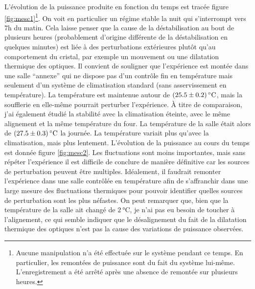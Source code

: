 \documentclass[11pt,a4paper]{article}
\begin{document}
L'évolution de la puissance produite en fonction du temps est tracée figure \ref{fig:mesc1}\footnote{Aucune manipulation n'a été effectuée sur le système pendant ce temps. En particulier, les remontées de puissance sont du fait du système lui-même. L'enregistrement a été arrêté après une absence de remontée sur plusieurs heures.}. On voit en particulier un régime stable la nuit qui s'interrompt vers 7h du matin. Cela laisse penser que la cause de la déstabilisation au bout de plusieurs heures (probablement d'origine différente de la déstabilisation en quelques minutes) est liée à des perturbations extérieures plutôt qu'au comportement du cristal, par exemple un mouvement ou une dilatation thermique des optiques. Il convient de souligner que l'expérience est montée dans une salle ``annexe'' qui ne dispose pas d'un contrôle fin en température mais seulement d'un système de climatisation standard (sans asservissement en température). La température est maintenue autour de $\SI{25.5+-0.2}{\celsius}$, mais la soufflerie en elle-même pourrait perturber l'expérience. À titre de comparaison, j'ai également étudié la stabilité avec la climatisation éteinte, avec le même alignement et la même température du four. La température de la salle était alors de $\SI{27.5+-0.3}{\celsius}$ la journée. La température variait plus qu'avec la climatisation, mais plus lentement. L'évolution de la puissance au cours du temps est donnée figure \ref{fig:mesc2}. Les fluctuations sont moins importantes, mais sans répéter l'expérience il est difficile de conclure de manière définitive car les sources de perturbation peuvent être multiples. Idéalement, il faudrait remonter l'expérience dans une salle contrôlée en température afin de s'affranchir dans une large mesure des fluctuations thermiques pour pouvoir identifier quelles sources de perturbation sont les plus néfastes. On peut remarquer que, bien que la température de la salle ait changé de $\SI{2}{\celsius}$, je n'ai pas eu besoin de toucher à l'alignement, ce qui semble indiquer que le désalignement du fait de la dilatation thermique des optiques n'est pas la cause des variations de puissance observées.
\end{document}
